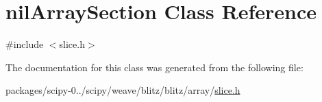 \hypertarget{classnilArraySection}{}\section{nil\+Array\+Section Class Reference}
\label{classnilArraySection}


{\ttfamily \#include $<$slice.\+h$>$}



The documentation for this class was generated from the following file\+:\begin{DoxyCompactItemize}
\item 
packages/scipy-\/0../scipy/weave/blitz/blitz/array/\hyperlink{slice_8h}{slice.\+h}\end{DoxyCompactItemize}
